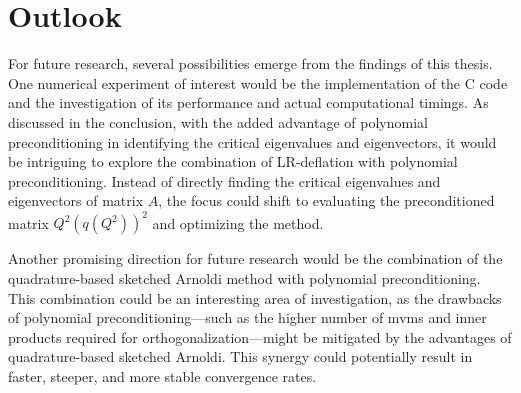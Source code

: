 \chapter{Outlook}
\label{sec:outlook}

For future research, several possibilities emerge from the findings of this thesis. One numerical experiment of interest would be the implementation of the C code and the investigation of its performance and actual computational timings. As discussed in the conclusion, with the added advantage of polynomial preconditioning in identifying the critical eigenvalues and eigenvectors, it would be intriguing to explore the combination of LR-deflation with polynomial preconditioning. Instead of directly finding the critical eigenvalues and eigenvectors of matrix $A$, the focus could shift to evaluating the preconditioned matrix $Q^2(q(Q^2))^2$ and optimizing the method.

Another promising direction for future research would be the combination of the quadrature-based sketched Arnoldi method with polynomial preconditioning. This combination could be an interesting area of investigation, as the drawbacks of polynomial preconditioning—such as the higher number of mvms and inner products required for orthogonalization—might be mitigated by the advantages of quadrature-based sketched Arnoldi. This synergy could potentially result in faster, steeper, and more stable convergence rates.
